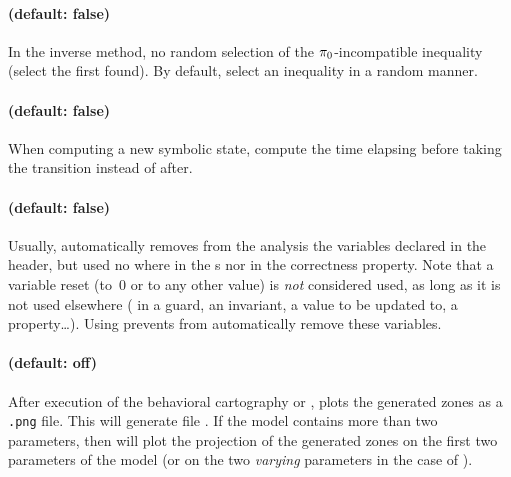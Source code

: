 \paragraph{ (default: false)}
In the inverse method, no random selection of the $\pi_0$-incompatible inequality (select the first found).
By default, select an inequality in a random manner.


\paragraph{ (default: false)}
When computing a new symbolic state, compute the time elapsing before taking the transition instead of after.



\paragraph{ (default: false)}
Usually, \imitator{} automatically removes from the analysis the variables declared in the header, but used no where in the \IPTA{}s nor in the correctness property.
Note that a variable reset (to~0 or to any other value) is \emph{not} considered used, as long as it is not used elsewhere (\ie{} in a guard, an invariant, a value to be updated to, a property…).
Using  prevents \imitator{} from automatically remove these variables.



\paragraph{ (default: off)}

After execution of the behavioral cartography or \EFsynth{}, plots the generated zones as a \texttt{.png} file.
This will generate file .
If the model contains more than two parameters, then  will plot the projection of the generated zones on the first two parameters of the model (or on the two \emph{varying} parameters in the case of \BC{}).

